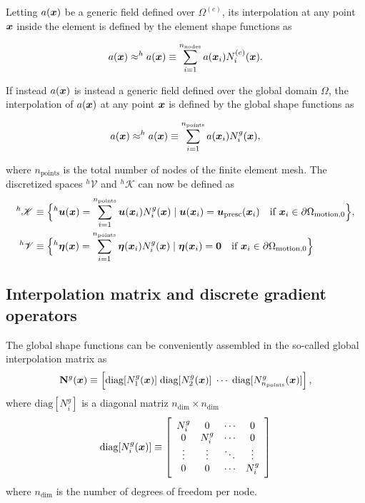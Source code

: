 Letting $a(\bm{x})$ be a generic field defined over $\Omega^{(e)}$, its interpolation at any point $\bm{x}$ inside the element is defined by the element shape functions as
\begin{highlight}
    \begin{equation}
        a(\bm{x}) \approx ^ha(\bm{x}) \equiv \sum_{i=1}^{n_\text{nodes}} a(\bm{x}_i) N_i^{(e)}(\bm{x}).
    \end{equation}
\end{highlight}
If instead $a(\bm{x})$ is instead a generic field defined over the global domain $\Omega$, the interpolation of $a(\bm{x})$ at any point $\bm{x}$ is defined by the global shape functions as
\begin{highlight}
    \begin{equation}
        a(\bm{x}) \approx ^h a(\bm{x}) \equiv \sum_{i=1}^{n_\text{points}} a(\bm{x}_i) N_i^g(\bm{x}), \label{eq:interpol_global}
    \end{equation}
\end{highlight}
where $n_\text{points}$ is the total number of nodes of the finite element mesh.
The discretized spaces $^h \mathscr{V}$ and $^h\mathscr{K}$ can now be defined as
\begin{align}
    ^h \mathscr{K}&\equiv \Big\{\vphantom{|}^h\bm{u}(\bm{x}) = \sum_{i=1}^{n_\text{points}} \bm{u}(\bm{x}_i) N_i^g(\bm{x})\;|\; \bm{u}(\bm{x}_i) = \bm{u}_\text{presc}(\bm{x}_i)\quad\text{if $\bm{x}_i\in \partial\Omega_\text{motion,0}$}  \Big\},\\
    ^h\mathscr{V}&\equiv \Big\{\vphantom{|}^h\bm{\eta}(\bm{x}) = \sum_{i=1}^{n_\text{points} } \bm{\eta}(\bm{x}_i) N_i^g(\bm{x})\;|\;\bm{\eta}(\bm{x}_i)=\bm{0}\quad\text{if $\bm{x}_i\in \partial\Omega_\text{motion,0}$}   \Big\}
\end{align}

\subsection{Interpolation matrix and discrete gradient operators}

The global shape functions can be conveniently assembled in the so-called global interpolation matrix as
\begin{equation}
    \mathbf N^g(\bm{x}) \equiv \left[\text{diag}[N_1^g(\bm{x})]\; \text{diag}[N_2^g(\bm{x})]\;\cdots\; \text{diag}[N_{n_\text{points}}^g(\bm{x})]\right],
\end{equation}
where $\text{diag}[N_i^g]$ is a diagonal matriz $n_\text{dim} \times n_\text{dim}$
\begin{equation}
    \text{diag}[N_i^g(\bm{x})]\equiv \left[
    \begin{array}{cccc}
         N_i^g & 0 & \cdots & 0  \\
         0     & N_i^g & \cdots & 0 \\
         \vdots & \vdots & \ddots & \vdots \\
         0 & 0 & \cdots & N_i^g
    \end{array}
    \right]
\end{equation}
where $n_\text{dim}$ is the number of degrees of freedom per node.

